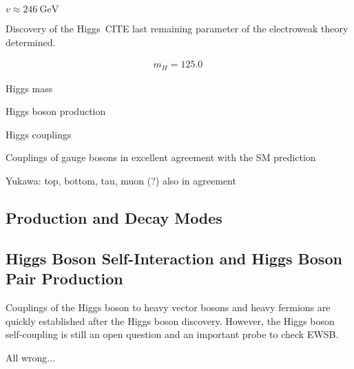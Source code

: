









$v \approx \SI{246}{\GeV}$


Discovery of the Higgs~CITE last remaining parameter of the electroweak theory
determined.

\begin{align*}
  m_{H} = \SI{125.0}{}
\end{align*}


Higgs mass

Higgs boson production

Higgs couplings


Couplings of gauge bosons in excellent agreement with the SM prediction

Yukawa: top, bottom, tau, muon (?) also in agreement








\clearpage
{}

\subsection{Production and Decay Modes}

\subsection{Higgs Boson Self-Interaction and Higgs Boson Pair Production}

Couplings of the Higgs boson to heavy vector bosons and heavy fermions
are quickly established after the Higgs boson discovery. However, the
Higgs boson self-coupling is still an open question and an important
probe to check EWSB.


All wrong...

